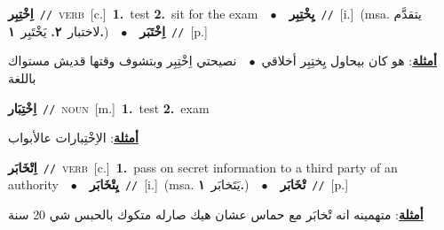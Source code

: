 \documentclass[10pt,a4paper,twoside]{article} %
\begin{document}
\begin{multicols}{2}
{{\setlength\topsep{0pt}\textbf{\foreignlanguage{arabic}{اِخْتِبِر}}\ {\color{gray}\texttt{//}\color{black}}\ \textsc{verb}\ [c.]\ \textbf{1.}~test  \textbf{2.}~sit for the exam\ \ $\bullet$\ \ \setlength\topsep{0pt}\textbf{\foreignlanguage{arabic}{يِخْتِبِر}}\ {\color{gray}\texttt{//}\color{black}}\ [i.]\ \color{gray}(msa. \foreignlanguage{arabic}{يتقدَّم لاختبار}~\foreignlanguage{arabic}{\textbf{٢.}}  \foreignlanguage{arabic}{يَخْتَبِر}~\foreignlanguage{arabic}{\textbf{١.}})\color{black}\ \ $\bullet$\ \ \setlength\topsep{0pt}\textbf{\foreignlanguage{arabic}{اِخْتَبَر}}\ {\color{gray}\texttt{//}\color{black}}\ [p.]\  \begin{flushright}\color{gray}\foreignlanguage{arabic}{\textbf{\underline{\foreignlanguage{arabic}{أمثلة}}}: هو كان بيحاول يِختِبِر أخلاقي\ $\bullet$\ \  نصيحتي اِخْتِبِر وبتشوف وقتها قديش مستواك باللغة}\end{flushright}\color{black}} \vspace{2mm}

{\setlength\topsep{0pt}\textbf{\foreignlanguage{arabic}{اِخْتِبَار}}\ {\color{gray}\texttt{//}\color{black}}\ \textsc{noun}\ [m.]\ \textbf{1.}~test  \textbf{2.}~exam\  \begin{flushright}\color{gray}\foreignlanguage{arabic}{\textbf{\underline{\foreignlanguage{arabic}{أمثلة}}}: الاِخْتِبارات عالأبواب}\end{flushright}\color{black}} \vspace{2mm}

{\setlength\topsep{0pt}\textbf{\foreignlanguage{arabic}{اِتْخَابَر}}\ {\color{gray}\texttt{//}\color{black}}\ \textsc{verb}\ [c.]\ \textbf{1.}~pass on secret information to a third party of an authority\ \ $\bullet$\ \ \setlength\topsep{0pt}\textbf{\foreignlanguage{arabic}{يِتْخَابَر}}\ {\color{gray}\texttt{//}\color{black}}\ [i.]\ \color{gray}(msa. \foreignlanguage{arabic}{يَتَخابَر}~\foreignlanguage{arabic}{\textbf{١.}})\color{black}\ \ $\bullet$\ \ \setlength\topsep{0pt}\textbf{\foreignlanguage{arabic}{تْخَابَر}}\ {\color{gray}\texttt{//}\color{black}}\ [p.]\  \begin{flushright}\color{gray}\foreignlanguage{arabic}{\textbf{\underline{\foreignlanguage{arabic}{أمثلة}}}: متهمينه انه تْخابَر مع حماس عشان هيك صارله متكوك بالحبس شي 20 سنة}\end{flushright}\color{black}} \vspace{2mm}

}
\end{multicols}
\end{document}
